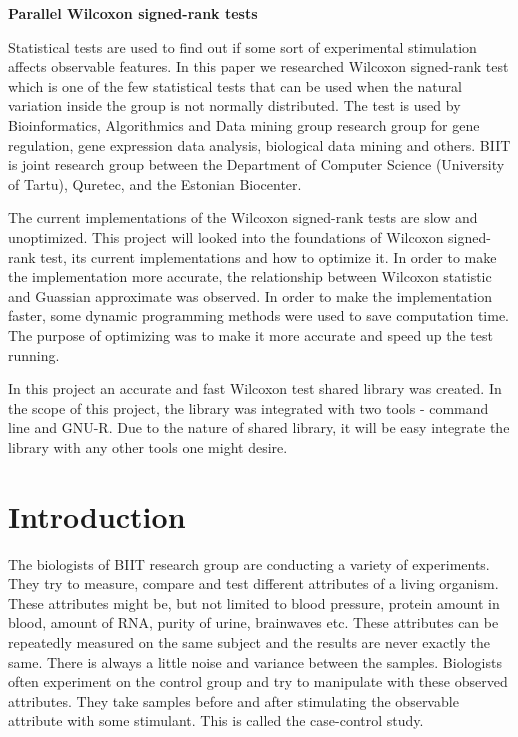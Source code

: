 \documentclass[12pt]{article}
\begin{document}
\noindent\textbf{\large Parallel Wilcoxon signed-rank tests}
\vspace*{3ex}
{
Statistical tests are used to find out if some sort of experimental stimulation affects observable features. In this paper we researched Wilcoxon signed-rank test which is one of the few statistical tests that can be used when the natural variation inside the group is not normally distributed. The test is used by Bioinformatics, Algorithmics and Data mining group research group for gene regulation, gene expression data analysis, biological data mining and others. BIIT is joint research group between the Department of Computer Science (University of Tartu), Quretec, and the Estonian Biocenter.

The current implementations of the Wilcoxon signed-rank tests are slow and unoptimized. This project will looked into the foundations of Wilcoxon signed-rank test, its current implementations and how to optimize it. In order to make the implementation more accurate, the relationship between Wilcoxon statistic and Guassian approximate was observed. In order to make the implementation faster, some dynamic programming methods were used to save computation time. The purpose of optimizing was to make it more accurate and speed up the test running.

In this project an accurate and fast Wilcoxon test shared library was created. In the scope of this project, the library was integrated with two tools - command line and GNU-R. Due to the nature of shared library, it will be easy integrate the library with any other tools one might desire.

\vspace*{3ex}
{}



\newpage

\tableofcontents

\newpage

\section{Introduction}
The biologists of BIIT research group are conducting a variety of experiments. They try to measure, compare and test different attributes of a living organism. These attributes might be, but not limited to blood pressure, protein amount in blood, amount of RNA, purity of urine, brainwaves etc. These attributes can be repeatedly measured on the same subject and the results are never exactly the same. There is always a little noise and variance between the samples. Biologists often experiment on the control group and try to manipulate with these observed attributes. They take samples before and after stimulating the observable attribute with some stimulant. This is called the case-control study.

}
\end{document}
